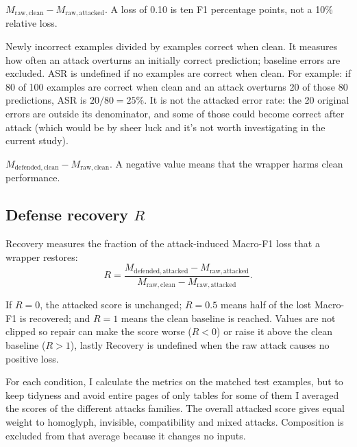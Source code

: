  \(M_{\mathrm{raw,clean}}-M_{\mathrm{raw,attacked}}\). A loss of 0.10 is ten F1 percentage points, not a 10\% relative loss. 

 Newly incorrect examples divided by examples correct when clean. It measures how often an attack overturns an initially correct prediction; baseline errors are excluded. ASR is undefined if no examples are correct when clean. For example: if 80 of 100 examples are correct when clean and an attack overturns 20 of those 80 predictions, ASR is \(20/80=25\%\). It is not the attacked error rate: the 20 original errors are outside its denominator, and some of those could become correct after attack (which would be by sheer luck and it's not worth investigating in the current study).


 \(M_{\mathrm{defended,clean}}-M_{\mathrm{raw,clean}}\). A negative value means that the wrapper harms clean performance.



\subsection{Defense recovery \texorpdfstring{\(R\)}{R}}
\label{sec:recovery-definition}
Recovery measures the fraction of the attack-induced Macro-F1 loss that a wrapper restores:
\begin{equation}
R=\frac{M_{\mathrm{defended,attacked}}-M_{\mathrm{raw,attacked}}}
        {M_{\mathrm{raw,clean}}-M_{\mathrm{raw,attacked}}}.
\label{eq:recovery}
\end{equation}

If \(R=0\), the attacked score is unchanged; \(R=0.5\) means half of the lost Macro-F1 is recovered; and \(R=1\) means the clean baseline is reached. Values are not clipped so repair can make the score worse (\(R<0\)) or raise it above the clean baseline (\(R>1\)), lastly Recovery is undefined when the raw attack causes no positive loss.

For each condition, I calculate the metrics on the matched test examples, but to keep tidyness and avoid entire pages of only tables for some of them I averaged the scores of the different attacks families. The overall attacked score gives equal weight to homoglyph, invisible, compatibility and mixed attacks. Composition is excluded from that average because it changes no inputs.
